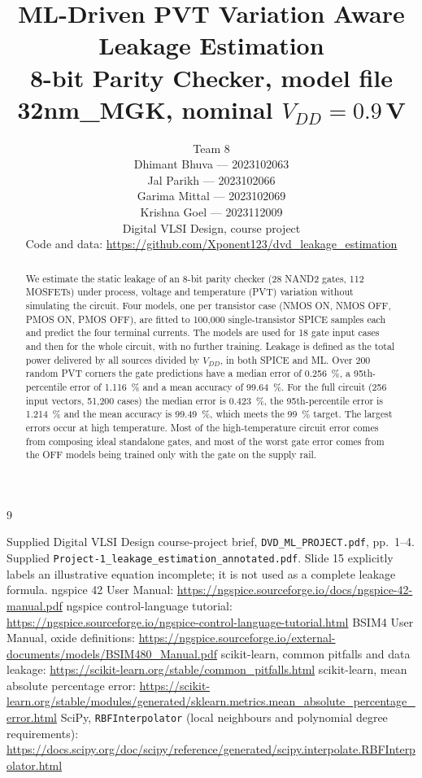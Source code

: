 \documentclass[11pt,a4paper]{article}
\title{ML-Driven PVT Variation Aware Leakage Estimation\\[2pt]
\large 8-bit Parity Checker, model file 32nm\_MGK, nominal $V_{DD}=0.9$\,V}
\author{Team 8\\
Dhimant Bhuva --- 2023102063\\
Jal Parikh --- 2023102066\\
Garima Mittal --- 2023102069\\
Krishna Goel --- 2023112009\\
Digital VLSI Design, course project\\[4pt]
Code and data: \url{https://github.com/Xponent123/dvd_leakage_estimation}}
\date{}
\begin{document}
\maketitle

\begin{abstract}
We estimate the static leakage of an 8-bit parity checker (28 NAND2 gates, 112 MOSFETs) under process, voltage and temperature (PVT) variation without simulating the circuit. Four models, one per transistor case (NMOS ON, NMOS OFF, PMOS ON, PMOS OFF), are fitted to 100,000 single-transistor SPICE samples each and predict the four terminal currents. The models are used for 18 gate input cases and then for the whole circuit, with no further training. Leakage is defined as the total power delivered by all sources divided by $V_{DD}$, in both SPICE and ML. Over 200 random PVT corners the gate predictions have a median error of \SI{0.256}{\percent}, a 95th-percentile error of \SI{1.116}{\percent} and a mean accuracy of \SI{99.64}{\percent}. For the full circuit (256 input vectors, 51,200 cases) the median error is \SI{0.423}{\percent}, the 95th-percentile error is \SI{1.214}{\percent} and the mean accuracy is \SI{99.49}{\percent}, which meets the \SI{99}{\percent} target. The largest errors occur at high temperature. Most of the high-temperature circuit error comes from composing ideal standalone gates, and most of the worst gate error comes from the OFF models being trained only with the gate on the supply rail.
\end{abstract}

\tableofcontents
\clearpage









\appendix



\clearpage
\begin{thebibliography}{9}
 Supplied Digital VLSI Design course-project brief, \texttt{DVD\_ML\_PROJECT.pdf}, pp.\ 1--4.
 Supplied \texttt{Project-1\_leakage\_estimation\_annotated.pdf}. Slide 15 explicitly labels an illustrative equation incomplete; it is not used as a complete leakage formula.
 ngspice 42 User Manual: \url{https://ngspice.sourceforge.io/docs/ngspice-42-manual.pdf}
 ngspice control-language tutorial: \url{https://ngspice.sourceforge.io/ngspice-control-language-tutorial.html}
 BSIM4 User Manual, oxide definitions: \url{https://ngspice.sourceforge.io/external-documents/models/BSIM480_Manual.pdf}
 scikit-learn, common pitfalls and data leakage: \url{https://scikit-learn.org/stable/common_pitfalls.html}
 scikit-learn, mean absolute percentage error: \url{https://scikit-learn.org/stable/modules/generated/sklearn.metrics.mean_absolute_percentage_error.html}
 SciPy, \texttt{RBFInterpolator} (local neighbours and polynomial degree requirements): \url{https://docs.scipy.org/doc/scipy/reference/generated/scipy.interpolate.RBFInterpolator.html}
\end{thebibliography}
\nocite{*}
\end{document}
